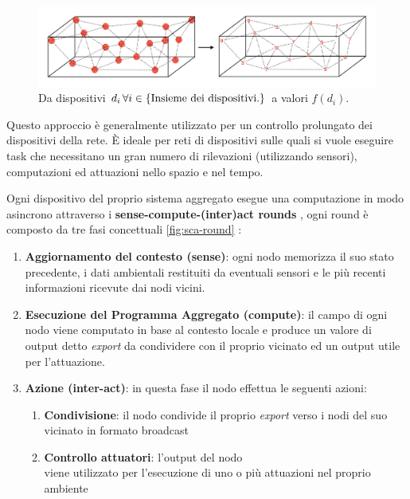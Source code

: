 \documentclass[12pt,a4paper,openright,twoside]{book}
\begin{document}
\begin{figure}
    \centering
    \includegraphics[width=.9\linewidth]{figures/device-to-value.pdf}
    \caption{Da dispositivi $d_i \thinspace \forall i \in {\text{\{Insieme dei dispositivi.\}}}$ a valori $f(d_i)$.}
    \label{fig:device-to-value}
\end{figure}

Questo approccio è generalmente utilizzato per un controllo prolungato dei dispositivi della rete. È ideale per reti di dispositivi sulle quali si vuole eseguire task che necessitano un gran numero di rilevazioni (utilizzando sensori), computazioni ed attuazioni nello spazio e nel tempo.

Ogni dispositivo del proprio sistema aggregato esegue una computazione in modo asincrono attraverso i \textbf{sense-compute-(inter)act rounds}\label{sec:sense-compute-interact} \cite{Macroswarm}, ogni round è composto da tre fasi concettuali \cref{fig:sca-round} \cite{Casadei2021-2}:

\begin{enumerate}
    \item \textbf{Aggiornamento del contesto (sense)}: ogni nodo memorizza il suo stato precedente, i dati ambientali restituiti da eventuali sensori e le più recenti informazioni ricevute dai nodi vicini.
    \item \textbf{Esecuzione del Programma Aggregato (compute)}: il campo di ogni nodo viene computato in base al contesto locale e produce un valore di output detto \textit{export} da condividere con il proprio vicinato ed un output utile per l'attuazione.
    \item \textbf{Azione (inter-act)}: in questa fase il nodo effettua le seguenti azioni:
    \begin{enumerate}
        \item \textbf{Condivisione}: il nodo condivide il proprio \textit{export} verso i nodi del suo vicinato in formato broadcast
        \item \textbf{Controllo attuatori}: l'output del nodo \\ viene 
        utilizzato per l'esecuzione di uno o più attuazioni nel proprio ambiente
    \end{enumerate}
\end{enumerate}
\end{document}
